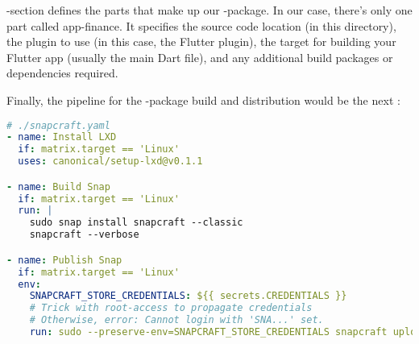 \noindent {}-section defines the parts that make up our -package. In our case, there's only one part 
called app-finance. It specifies the source code location (in this directory), the plugin to use (in this case, the 
Flutter plugin), the target for building your Flutter app (usually the main Dart file), and any additional build 
packages or dependencies required.

Finally, the pipeline for the -package build and distribution would be the next :

\begin{lstlisting}[language=yaml]
# ./snapcraft.yaml
- name: Install LXD
  if: matrix.target == 'Linux'
  uses: canonical/setup-lxd@v0.1.1

- name: Build Snap
  if: matrix.target == 'Linux'
  run: |
    sudo snap install snapcraft --classic
    snapcraft --verbose

- name: Publish Snap
  if: matrix.target == 'Linux'
  env:
    SNAPCRAFT_STORE_CREDENTIALS: ${{ secrets.CREDENTIALS }}
    # Trick with root-access to propagate credentials
    # Otherwise, error: Cannot login with 'SNA...' set.
    run: sudo --preserve-env=SNAPCRAFT_STORE_CREDENTIALS snapcraft upload *.snap --release=latest/stable
\end{lstlisting}
